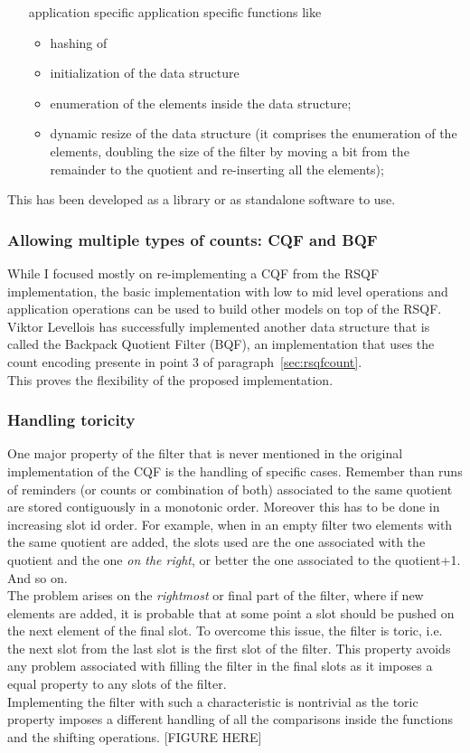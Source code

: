 \begin{itemize}
\begin{itemize}
	\end{itemize}
	\item[application specific] application specific functions like
	\begin{itemize}
		\item hashing of \kmers
		\item initialization of the data structure
		\item enumeration of the elements inside the data structure;
		\item dynamic resize of the data structure (it comprises the enumeration of the elements, doubling the size of the filter by moving a bit from the remainder to the quotient and re-inserting all the elements);
	\end{itemize} 
\end{itemize}
This has been developed as a library or as standalone software to use.
\subsubsection{Allowing multiple types of counts: CQF and BQF}
While I focused mostly on re-implementing a CQF from the RSQF implementation, the basic implementation with low to mid level operations and application operations can be used to build other models on top of the RSQF. Viktor Levellois has successfully implemented another data structure that is called the Backpack Quotient Filter (BQF), an implementation that uses the count encoding presente in point 3 of paragraph~\ref{sec:rsqfcount}.\\
This proves the flexibility of the proposed implementation.
\subsubsection{Handling toricity}
One major property of the filter that is never mentioned in the original implementation of the CQF is the handling of specific cases. Remember than runs of reminders (or counts or combination of both) associated to the same quotient are stored contiguously in a monotonic order. Moreover this has to be done in increasing slot id order. For example, when in an empty filter two elements with the same quotient are added, the slots used are the one associated with the quotient and the one \emph{on the right}, or better the one associated to the quotient+1. And so on.\\
The problem arises on the \emph{rightmost} or final part of the filter, where if new elements are added, it is probable that at some point a slot should be pushed on the next element of the final slot. To overcome this issue, the filter is toric, i.e. the next slot from the last slot is the first slot of the filter. This property avoids any problem associated with filling the filter in the final slots as it imposes a equal property to any slots of the filter.\\
Implementing the filter with such a characteristic is nontrivial as the toric property imposes a different handling of all the comparisons inside the functions and the shifting operations.
[FIGURE HERE] 
